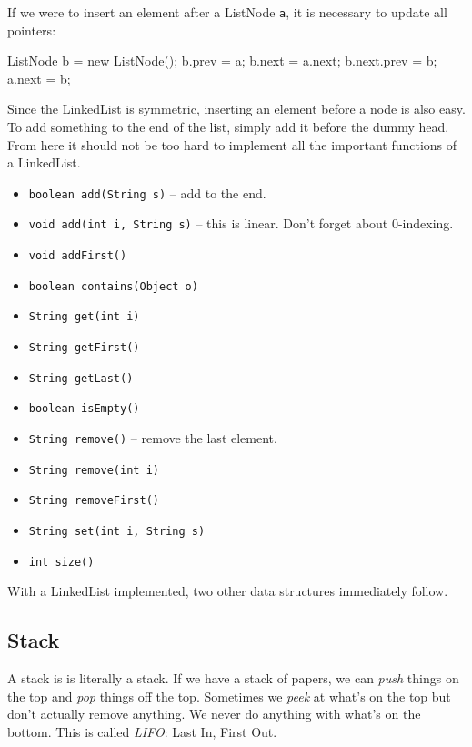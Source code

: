 \documentclass[11pt]{book}
\begin{document}
If we were to insert an element after a ListNode \texttt{a}, it is necessary to update all pointers:

\begin{mylstlisting}
ListNode b = new ListNode();
b.prev = a;
b.next = a.next;
b.next.prev = b;
a.next = b;
\end{mylstlisting}

Since the LinkedList is symmetric, inserting an element before a node is also easy. To add something to the end of the list, simply add it before the dummy head. From here it should not be too hard to implement all the important functions of a LinkedList.

\begin{itemize}

\item \texttt{boolean add(String s)} -- add to the end.
\item \texttt{void add(int i, String s)} -- this is linear. Don't forget about 0-indexing.
\item \texttt{void addFirst()}
\item \texttt{boolean contains(Object o)}
\item \texttt{String get(int i)}
\item \texttt{String getFirst()}
\item \texttt{String getLast()}
\item \texttt{boolean isEmpty()}
\item \texttt{String remove()} -- remove the last element.
\item \texttt{String remove(int i)}
\item \texttt{String removeFirst()}
\item \texttt{String set(int i, String s)}
\item \texttt{int size()}

\end{itemize}

With a LinkedList implemented, two other data structures immediately follow.

\subsection{Stack}

A stack is is literally a stack. If we have a stack of papers, we can \textit{push} things on the top and \textit{pop} things off the top. Sometimes we \textit{peek} at what's on the top but don't actually remove anything. We never do anything with what's on the bottom. This is called \textit{LIFO}: Last In, First Out.
\end{document}
